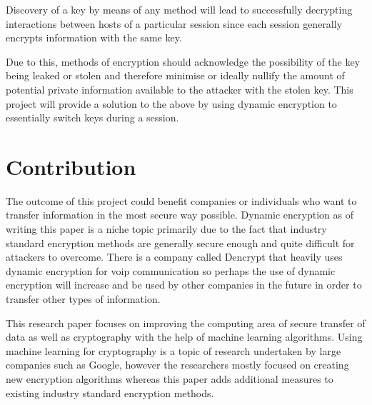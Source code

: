 Discovery of a key by means of any method will lead to successfully decrypting interactions between hosts of a particular session since each session generally encrypts information with the same key.

Due to this, methods of encryption should acknowledge the possibility of the key being leaked or stolen and therefore minimise or ideally nullify the amount of potential private information available to the attacker with the stolen key.
This project will provide a solution to the above by using dynamic encryption to essentially switch keys during a session.

\section{Contribution}
The outcome of this project could benefit companies or individuals who want to transfer information in the most secure way possible. Dynamic encryption as of writing this paper is a niche topic primarily due to the fact that industry standard encryption methods are generally secure enough and quite difficult for attackers to overcome. There is a company called Dencrypt \cite{dencrypt} that heavily uses dynamic encryption for voip communication so perhaps the use of dynamic encryption will increase and be used by other companies in the future in order to transfer other types of information.

This research paper focuses on improving the computing area of secure transfer of data as well as cryptography with the help of machine learning algorithms. Using machine learning for cryptography is a topic of research undertaken by large companies such as Google, however the researchers mostly focused on creating new encryption algorithms whereas this paper adds additional measures to existing industry standard encryption methods. 


